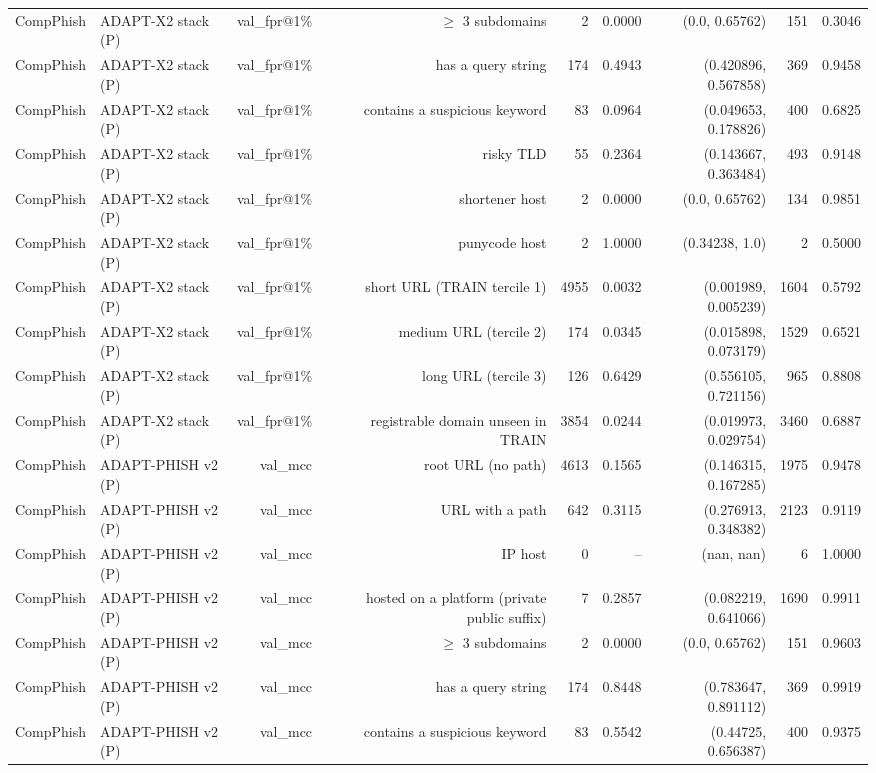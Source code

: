 \begin{table}[t]
\begin{tabular}{llrrrrrrr}
CompPhish & ADAPT-X2 stack (P) & val\_fpr@1\% & $\geq$ 3 subdomains & 2 & 0.0000 & (0.0, 0.65762) & 151 & 0.3046 \\
CompPhish & ADAPT-X2 stack (P) & val\_fpr@1\% & has a query string & 174 & 0.4943 & (0.420896, 0.567858) & 369 & 0.9458 \\
CompPhish & ADAPT-X2 stack (P) & val\_fpr@1\% & contains a suspicious keyword & 83 & 0.0964 & (0.049653, 0.178826) & 400 & 0.6825 \\
CompPhish & ADAPT-X2 stack (P) & val\_fpr@1\% & risky TLD & 55 & 0.2364 & (0.143667, 0.363484) & 493 & 0.9148 \\
CompPhish & ADAPT-X2 stack (P) & val\_fpr@1\% & shortener host & 2 & 0.0000 & (0.0, 0.65762) & 134 & 0.9851 \\
CompPhish & ADAPT-X2 stack (P) & val\_fpr@1\% & punycode host & 2 & 1.0000 & (0.34238, 1.0) & 2 & 0.5000 \\
CompPhish & ADAPT-X2 stack (P) & val\_fpr@1\% & short URL (TRAIN tercile 1) & 4955 & 0.0032 & (0.001989, 0.005239) & 1604 & 0.5792 \\
CompPhish & ADAPT-X2 stack (P) & val\_fpr@1\% & medium URL (tercile 2) & 174 & 0.0345 & (0.015898, 0.073179) & 1529 & 0.6521 \\
CompPhish & ADAPT-X2 stack (P) & val\_fpr@1\% & long URL (tercile 3) & 126 & 0.6429 & (0.556105, 0.721156) & 965 & 0.8808 \\
CompPhish & ADAPT-X2 stack (P) & val\_fpr@1\% & registrable domain unseen in TRAIN & 3854 & 0.0244 & (0.019973, 0.029754) & 3460 & 0.6887 \\
CompPhish & ADAPT-PHISH v2 (P) & val\_mcc & root URL (no path) & 4613 & 0.1565 & (0.146315, 0.167285) & 1975 & 0.9478 \\
CompPhish & ADAPT-PHISH v2 (P) & val\_mcc & URL with a path & 642 & 0.3115 & (0.276913, 0.348382) & 2123 & 0.9119 \\
CompPhish & ADAPT-PHISH v2 (P) & val\_mcc & IP host & 0 & -- & (nan, nan) & 6 & 1.0000 \\
CompPhish & ADAPT-PHISH v2 (P) & val\_mcc & hosted on a platform (private public suffix) & 7 & 0.2857 & (0.082219, 0.641066) & 1690 & 0.9911 \\
CompPhish & ADAPT-PHISH v2 (P) & val\_mcc & $\geq$ 3 subdomains & 2 & 0.0000 & (0.0, 0.65762) & 151 & 0.9603 \\
CompPhish & ADAPT-PHISH v2 (P) & val\_mcc & has a query string & 174 & 0.8448 & (0.783647, 0.891112) & 369 & 0.9919 \\
CompPhish & ADAPT-PHISH v2 (P) & val\_mcc & contains a suspicious keyword & 83 & 0.5542 & (0.44725, 0.656387) & 400 & 0.9375 \\

\end{tabular}
\end{table}
